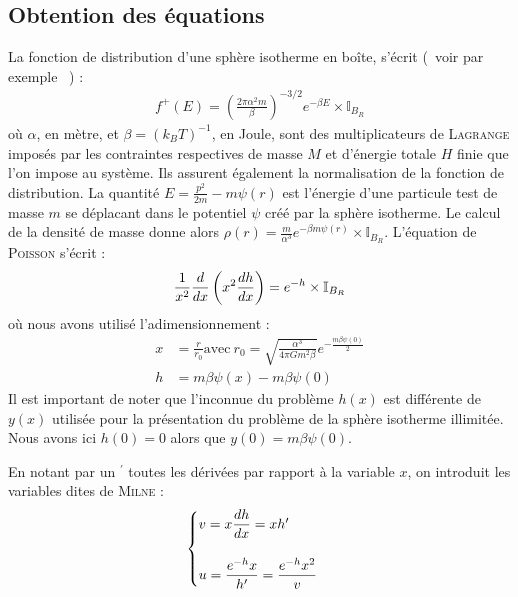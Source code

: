 \subsection{Obtention des équations}
	La fonction de distribution d'une sphère isotherme en boîte, s'écrit (~voir par exemple \cite{CoursJP}~) :
	\begin{eqnarray}
		f^+(E) = \left(\frac{2\pi\alpha^2m}{\beta}\right)^{-3/2}e^{-\beta E}\times\mathbb{I}_{B_R}
	\end{eqnarray}
	où $\alpha$, en mètre, et $\beta=(k_B T)^{-1}$, en Joule, sont des multiplicateurs de \textsc{Lagrange} imposés par les contraintes respectives de masse $M$ et d'énergie totale $H$ finie que l'on impose au système.
	Ils assurent également la normalisation de la fonction de distribution.
	La quantité \mbox{$E = \frac{p^2}{2m} - m\psi(r)$} est l'énergie d'une particule test de masse $m$ se déplacant dans
	le potentiel $\psi$ créé par la sphère isotherme.
	Le calcul de la densité de masse donne alors \mbox{$\rho(r) = \frac{m}{\alpha^3}e^{-\beta m \psi(r)}\times\mathbb{I}_{B_R}$}. %
	L'équation de \textsc{Poisson} s'écrit :
	\begin{equation}
		 \frac{1}{x^2}\frac{d}{dx}\left(x^2\frac{d h}{dx}\right) = e^{-h} \times\mathbb{I}_{B_R} \notag
	\end{equation}
	où nous avons utilisé l'adimensionnement  :
	\begin{eqnarray}
		x &= \frac{r}{r_0}\mathrm{ avec }\ r_0 = \sqrt{\frac{\alpha^3}{4\pi G m^2\beta}}e^{-\frac{m\beta\psi(0)}{2}} \label{toto11} \\
		h &= m\beta\psi(x) - m\beta\psi(0) \label{toto12}
		\end{eqnarray}
		Il est important de noter que l'inconnue du problème $h(x)$ est différente de $y(x)$ utilisée pour la présentation du problème de la sphère isotherme illimitée. Nous avons ici $h(0) = 0$ alors que $y(0) = m\beta\psi(0)$.
		
		En notant par un $^\prime$ toutes les dérivées par rapport à la variable $x$, on introduit les variables dites de \textsc{Milne :}
		$$\begin{cases}
			v = x \dfrac{d h}{dx} = x h' \\
			\\
			u = \dfrac{e^{-h} x}{h'} = \dfrac{e^{-h} x^2}{v}
		\end{cases}$$ \label{syst_uv}
		
